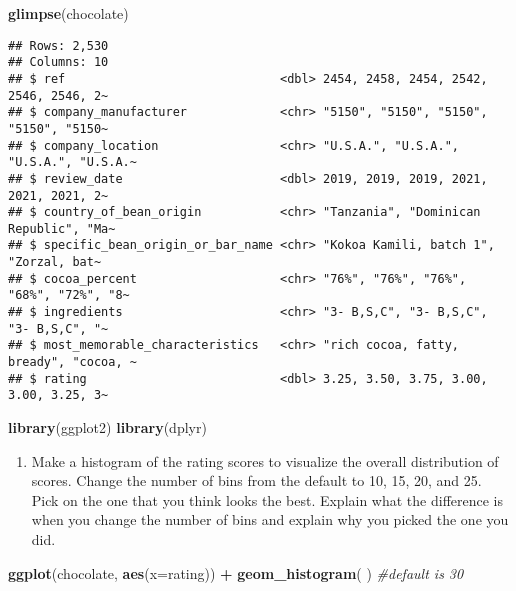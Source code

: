 \documentclass[
]{article}
\newenvironment{Shaded}{\begin{snugshade}}{\end{snugshade}}
\newcommand{\AttributeTok}[1]{\textcolor[rgb]{0.13,0.29,0.53}{#1}}
\newcommand{\CommentTok}[1]{\textcolor[rgb]{0.56,0.35,0.01}{\textit{#1}}}
\newcommand{\FunctionTok}[1]{\textcolor[rgb]{0.13,0.29,0.53}{\textbf{#1}}}
\newcommand{\NormalTok}[1]{#1}
\newcommand{\SpecialCharTok}[1]{\textcolor[rgb]{0.81,0.36,0.00}{\textbf{#1}}}
\providecommand{\tightlist}{%
  \setlength{\itemsep}{0pt}\setlength{\parskip}{0pt}}
\begin{document}
\begin{Shaded}
\begin{Highlighting}[]
\FunctionTok{glimpse}\NormalTok{(chocolate)}
\end{Highlighting}
\end{Shaded}

\begin{verbatim}
## Rows: 2,530
## Columns: 10
## $ ref                              <dbl> 2454, 2458, 2454, 2542, 2546, 2546, 2~
## $ company_manufacturer             <chr> "5150", "5150", "5150", "5150", "5150~
## $ company_location                 <chr> "U.S.A.", "U.S.A.", "U.S.A.", "U.S.A.~
## $ review_date                      <dbl> 2019, 2019, 2019, 2021, 2021, 2021, 2~
## $ country_of_bean_origin           <chr> "Tanzania", "Dominican Republic", "Ma~
## $ specific_bean_origin_or_bar_name <chr> "Kokoa Kamili, batch 1", "Zorzal, bat~
## $ cocoa_percent                    <chr> "76%", "76%", "76%", "68%", "72%", "8~
## $ ingredients                      <chr> "3- B,S,C", "3- B,S,C", "3- B,S,C", "~
## $ most_memorable_characteristics   <chr> "rich cocoa, fatty, bready", "cocoa, ~
## $ rating                           <dbl> 3.25, 3.50, 3.75, 3.00, 3.00, 3.25, 3~
\end{verbatim}

\begin{Shaded}
\begin{Highlighting}[]
\FunctionTok{library}\NormalTok{(ggplot2)}
\FunctionTok{library}\NormalTok{(dplyr)}
\end{Highlighting}
\end{Shaded}

\begin{enumerate}
\def\labelenumi{\arabic{enumi}.}
\tightlist
\item
  Make a histogram of the rating scores to visualize the overall
  distribution of scores. Change the number of bins from the default to
  10, 15, 20, and 25. Pick on the one that you think looks the best.
  Explain what the difference is when you change the number of bins and
  explain why you picked the one you did.
\end{enumerate}

\begin{Shaded}
\begin{Highlighting}[]
\FunctionTok{ggplot}\NormalTok{(chocolate, }\FunctionTok{aes}\NormalTok{(}\AttributeTok{x=}\NormalTok{rating)) }\SpecialCharTok{+} \FunctionTok{geom\_histogram}\NormalTok{(}
\NormalTok{) }\CommentTok{\#default is 30}
\end{Highlighting}
\end{Shaded}
\end{document}
